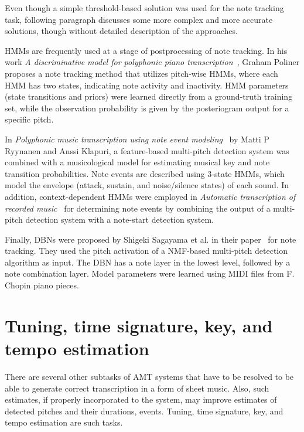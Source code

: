 Even though a simple threshold-based solution was used for the note tracking task, following paragraph discusses some
more complex and more accurate solutions, though without detailed description of the approaches.

\acp{HMM} are frequently used at a stage of postprocessing of note tracking. In his work \textit{A discriminative model
for polyphonic piano transcription}~\cite{poliner2006discriminative}, Graham Poliner proposes a note tracking method that
utilizes pitch-wise \acp{HMM}, where each \ac{HMM} has two states, indicating note activity and inactivity. \ac{HMM}
parameters (state transitions and priors) were learned directly from a ground-truth training set, while the observation
probability is given by the posteriogram output for a specific pitch.

In \textit{Polyphonic music transcription using note event modeling}~\cite{ryynanen2005polyphonic} by Matti P Ryynanen
and Anssi Klapuri, a feature-based multi-pitch detection system was combined with a musicological model for estimating
musical key and note transition probabilities. Note events are described using 3-state \acp{HMM}, which model
the envelope (attack, sustain, and noise/silence states) of each sound. In addition, context-dependent \acp{HMM} were
employed in \textit{Automatic transcription of recorded music}~\cite{grosche2012automatic} for determining note events by
combining the output of a multi-pitch detection system with a note-start detection system.

Finally, \acp{DBN} were proposed by Shigeki Sagayama et al. in their paper~\cite{raczynski2009note} for note tracking.
They used the pitch activation of a \ac{NMF}-based multi-pitch detection algorithm as input. The \ac{DBN} has a note
layer in the lowest level, followed by a note combination layer. Model parameters were learned using MIDI files from
F. Chopin piano pieces.

\section{Tuning, time signature, key, and tempo estimation}\label{sec:other-amt-subtasks}
There are several other subtasks of \ac{AMT} systems that have to be resolved to be able to generate correct
transcription in a form of sheet music. Also, such estimates, if properly incorporated to the system, may improve
estimates of detected pitches and their durations, events. Tuning, time signature, key, and tempo estimation are such
tasks.

